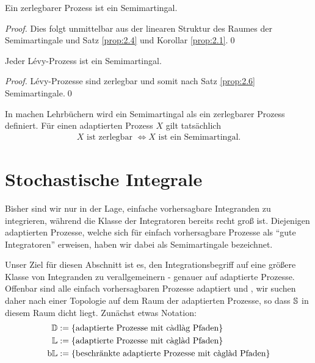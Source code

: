 \begin{theorem}
\label{prop:2.6}
Ein zerlegbarer Prozess ist ein Semimartingal.\fish
\end{theorem}
\begin{proof}
Dies folgt unmittelbar aus der linearen Struktur des Raumes der Semimartingale
und Satz \ref{prop:2.4} und Korollar \ref{prop:2.1}.\qed
\end{proof}

\begin{korollar}
Jeder L\'{e}vy-Prozess ist ein Semimartingal.\fish
\end{korollar}
\begin{proof}
Lévy-Prozesse sind zerlegbar \cite[Theorem
40]{Protter:2004wfa} und somit nach Satz \ref{prop:2.6} Semimartingale.\qed
\end{proof}

In machen Lehrbüchern wird ein Semimartingal als ein zerlegbarer Prozess
definiert. Für einen adaptierten \cadlag Prozess $X$ gilt tatsächlich
\begin{align*}
X \text{ ist zerlegbar } \iff X \text{ ist ein Semimartingal}.
\end{align*}  

\section{Stochastische Integrale}
\label{sec:stoch-int}

Bisher sind wir nur in der Lage, einfache vorhersagbare Integranden zu
integrieren, während die Klasse der Integratoren bereits recht groß ist.
Diejenigen adaptierten \cadlag Prozesse, welche sich für einfach vorhersagbare
Prozesse als "`gute Integratoren"' erweisen, haben wir dabei als Semimartingale
bezeichnet.

Unser Ziel für diesen Abschnitt ist es, den Integrationsbegriff auf eine größere
Klasse von Integranden zu verallgemeinern - 
genauer auf adaptierte \caglad Prozesse. Offenbar sind alle einfach
vorhersagbaren Prozesse adaptiert und \caglad, wir suchen daher nach einer
Topologie auf dem Raum der adaptierten \caglad Prozesse, so dass $\S$ in diesem
Raum dicht liegt. Zunächst etwas Notation:
 \begin{align*}
\D & \defl\{ \text{adaptierte Prozesse mit \cadlag\ Pfaden} \} \\
\L&\defl\{ \text{adaptierte Prozesse mit \caglad\ Pfaden} \} \\
\bL &\defl\{ \text{beschränkte adaptierte Prozesse mit \caglad\ Pfaden} \}
\end{align*}

